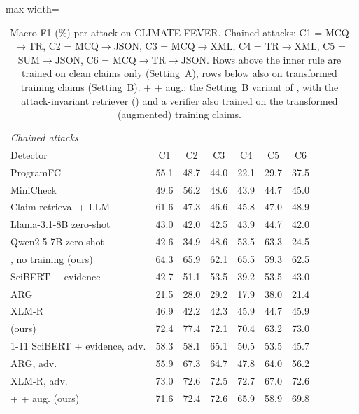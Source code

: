 \begin{table}[t]
\begin{adjustbox}{max width=\textwidth}
\begin{tabular}{lcccccccccc}
\multicolumn{11}{l}{\emph{Chained attacks}} \\
Detector & C1 & C2 & C3 & C4 & C5 & C6 &  &  &  &  \\
\midrule
ProgramFC \citep{pan2023programfc} & 55.1 & 48.7 & 44.0 & 22.1 & 29.7 & 37.5 &  &  &  &  \\
MiniCheck \citep{tang2024minicheck} & 49.6 & 56.2 & 48.6 & 43.9 & 44.7 & 45.0 &  &  &  &  \\
Claim retrieval + LLM \citep{pikuliak2023multiclaim} & 61.6 & 47.3 & 46.6 & 45.8 & 47.0 & 48.9 &  &  &  &  \\
Llama-3.1-8B zero-shot \citep{grattafiori2024llama3} & 43.0 & 42.0 & 42.5 & 43.9 & 44.7 & 42.0 &  &  &  &  \\
Qwen2.5-7B zero-shot \citep{qwen2024qwen25} & 42.6 & 34.9 & 48.6 & 53.5 & 63.3 & 24.5 &  &  &  &  \\
\method{}, no training (ours) & 64.3 & 65.9 & 62.1 & 65.5 & 59.3 & 62.5 &  &  &  &  \\
SciBERT + evidence \citep{kotonya2020pubhealth} & 42.7 & 51.1 & 53.5 & 39.2 & 53.5 & 43.0 &  &  &  &  \\
ARG \citep{hu2024arg} & 21.5 & 28.0 & 29.2 & 17.9 & 38.0 & 21.4 &  &  &  &  \\
XLM-R \citep{conneau2020xlmr} & 46.9 & 42.2 & 42.3 & 45.9 & 44.7 & 45.9 &  &  &  &  \\
\method{} (ours) & 72.4 & 77.4 & 72.1 & 70.4 & 63.2 & 73.0 &  &  &  &  \\
\cmidrule(lr){1-11}
SciBERT + evidence, adv. \citep{kotonya2020pubhealth} & 58.3 & 58.1 & 65.1 & 50.5 & 53.5 & 45.7 &  &  &  &  \\
ARG, adv. \citep{hu2024arg} & 55.9 & 67.3 & 64.7 & 47.8 & 64.0 & 56.2 &  &  &  &  \\
XLM-R, adv. \citep{conneau2020xlmr} & 73.0 & 72.6 & 72.5 & 72.7 & 67.0 & 72.6 &  &  &  &  \\
\method{} + \air{} + aug. (ours) & 71.6 & 72.4 & 72.6 & 65.9 & 58.9 & 69.8 &  &  &  &  \\
\bottomrule
\end{tabular}\end{adjustbox}
\caption{Macro-F1 (\%) per attack on CLIMATE-FEVER. Chained attacks: C1 = MCQ$\to$TR, C2 = MCQ$\to$JSON, C3 = MCQ$\to$XML, C4 = TR$\to$XML, C5 = SUM$\to$JSON, C6 = MCQ$\to$TR$\to$JSON. Rows above the inner rule are trained on clean claims only (Setting~A), rows below also on transformed training claims (Setting~B). \method{} + \air{} + aug.: the Setting~B variant of \method{}, with the attack-invariant retriever (\air{}) and a verifier also trained on the transformed (augmented) training claims.}
\label{tab:per_climatefever}
\end{table}
